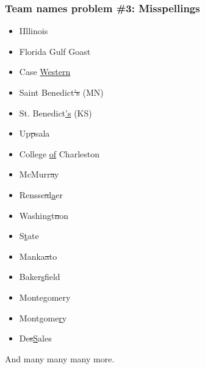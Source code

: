 \documentclass{beamer}
\begin{document}
\begin{frame}
\frametitle{Team names problem \#3: Misspellings}
\begin{multicols}{2}
\begin{itemize}
\item IIllinois
\item Florida Gulf Goast
\item Case \underline{Western}
\item Saint Benedict\sout{'s} (MN)
\item St. Benedict\underline{'s} (KS)
\item Up\sout psala
\item College \underline{of} Charleston
\item McMurr\sout ay
\item Rensse\sout al\underline aer
\item Washingt\sout non
\item S\underline tate
\item Manka\sout ato
\item Baker\underline sfield
\item Mont\cancel egomery
\item Montgome\underline ry
\item De\sout s\underline Sales
\end{itemize}
\end{multicols}
And many many many more.
\end{frame}
\end{document}
